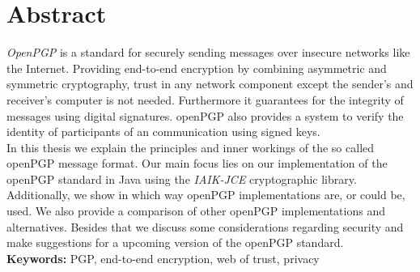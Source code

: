 

\chapter*{Abstract}
\label{cha:abstract}



\emph{OpenPGP} is a standard for securely sending messages over insecure networks like the Internet. Providing end-to-end encryption by combining asymmetric and symmetric cryptography, trust in any network component except the sender's and receiver's computer is not needed. Furthermore it guarantees for the integrity of messages using digital signatures. openPGP also provides a system to verify the identity of participants of an communication using signed keys. \\
 
 In this thesis we explain the principles and inner workings of the so called  openPGP message format. 
 Our main focus lies on our implementation of the openPGP standard in Java using the \emph{IAIK-JCE} cryptographic library. 
 Additionally, we show in which way openPGP implementations are, or could be, used.
 We also provide a comparison of other openPGP implementations and alternatives. 
 Besides that we discuss some considerations regarding security and make suggestions for a upcoming version of the openPGP standard. \\


\textbf{Keywords:} PGP, end-to-end encryption, web of trust, privacy

